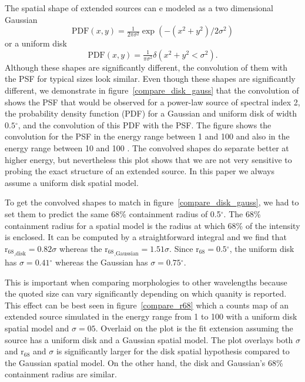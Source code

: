 \documentclass[12pt,preprint]{aastex}
\newcommand{\gev}{\text{GeV}\xspace}
\newcommand{\rsixeight}{{\ensuremath{\text{r}_{68}}}\xspace}
\renewcommand{\deg}{\ensuremath{^\circ}\xspace}
\begin{document}
The spatial shape of extended sources can e modeled
as a two dimensional Gaussian
\begin{equation}
  \text{PDF}(x,y)=\tfrac{1}{2\pi\sigma^2}\exp\left(-(x^2+y^2)/2\sigma^2\right)
\end{equation}
or a uniform disk
\begin{equation}
  \text{PDF}(x,y)=\tfrac{1}{\pi\sigma^2}\delta\left(x^2+y^2<\sigma^2\right).
\end{equation}
Although these shapes are significantly different, the convolution
of them with the PSF for typical sizes look similar.  Even
though these shapes are significantly different, we demonstrate in
figure~\ref{compare_disk_gauss} that the convolution of shows the
PSF that would be observed for a power-law source of spectral index
2, the probability density function (PDF) for a Gaussian and uniform
disk of width $0.5\deg$, and the convolution of this PDF with the PSF.
The figure shows the convolution for the PSF in the energy range between
1 \gev and 100 \gev and also in the energy range between 10 \gev and
100 \gev.  The convolved shapes do separate better at higher energy, but
nevertheless this plot shows that we are not very sensitive to probing
the exact structure of an extended source.  In this paper we always
assume a uniform disk spatial model.

To get the convolved shapes to match in figure~\ref{compare_disk_gauss},
we had to set them to predict the same 68\% containment radius of 0.5\deg.  The
68\% containment radius for a spatial model is the radius at which 68\%
of the intensity is enclosed.  It can be computed by a straightforward
integral and we find that $\rsixeight_\text{,disk}=0.82\sigma$ whereas the
$\rsixeight_\text{,Gaussian}=1.51\sigma$.  Since $\rsixeight=0.5\deg$,
the uniform disk has $\sigma=0.41\deg$ whereas the Gaussian has
$\sigma=0.75\deg$.

This is important when comparing morphologies to other wavelengths
because the quoted size can vary significantly depending on which quanity
is reported.  This effect can be best seen in figure~\ref{compare_r68}
which a counts map of an extended source simulated in the energy
range from 1 \gev to 100 \gev with a uniform disk spatial model and
$\sigma=05$. Overlaid on the plot is the fit extension assuming the
source has a uniform disk and a Gaussian spatial model. The plot overlays
both $\sigma$ and $\rsixeight$ and $\sigma$ is significantly larger for
the disk spatial hypothesis compared to the Gaussian spatial model. On
the other hand, the disk and Gaussian's 68\% containment radius are
similar.
\end{document}
